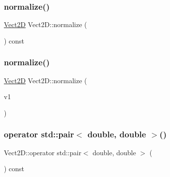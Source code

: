 \subsubsection{\texorpdfstring{normalize()}{normalize()}\hspace{0.1cm}{\footnotesize\ttfamily [2/3]}}
{\footnotesize\ttfamily \hyperlink{classVect2D}{Vect2D} Vect2\+D\+::normalize (\begin{DoxyParamCaption}{ }\end{DoxyParamCaption}) const}

\mbox{\label{classVect2D_a942fc02dc6fca9d2d9170316300d5d7f_a942fc02dc6fca9d2d9170316300d5d7f}} 
\subsubsection{\texorpdfstring{normalize()}{normalize()}\hspace{0.1cm}{\footnotesize\ttfamily [3/3]}}
{\footnotesize\ttfamily \hyperlink{classVect2D}{Vect2D} Vect2\+D\+::normalize (\begin{DoxyParamCaption}\item[{const \hyperlink{classVect2D}{Vect2D} \&}]{v1 }\end{DoxyParamCaption})\hspace{0.3cm}{\ttfamily [static]}}

\mbox{\label{classVect2D_adc9809c2f646699cc2a1b43936b5caf3_adc9809c2f646699cc2a1b43936b5caf3}} 
\subsubsection{\texorpdfstring{operator std\+::pair$<$ double, double $>$()}{operator std::pair< double, double >()}}
{\footnotesize\ttfamily Vect2\+D\+::operator std\+::pair$<$ double, double $>$ (\begin{DoxyParamCaption}{ }\end{DoxyParamCaption}) const}

\mbox{\label{classVect2D_a94963287794e76b9a511fb5f766d9082_a94963287794e76b9a511fb5f766d9082}} 
